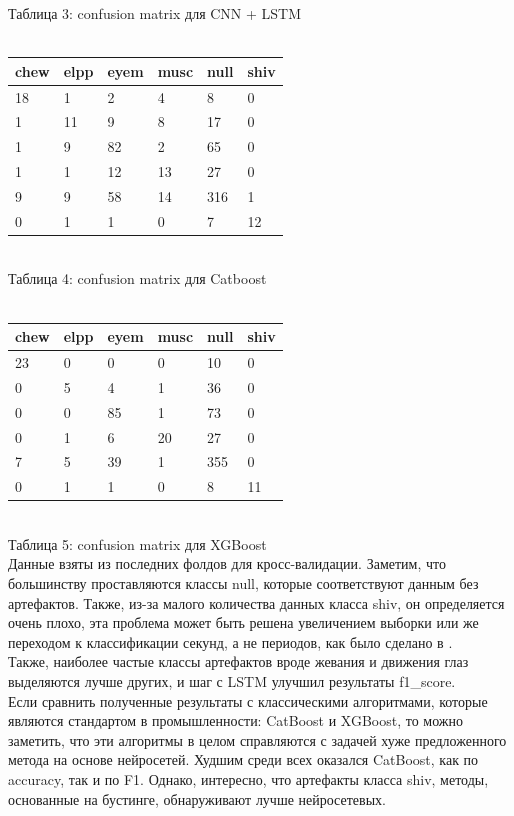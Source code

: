 \documentclass[12pt, a4paper, titlepage]{extreport}
\begin{document}
	Таблица 3: confusion matrix для CNN + LSTM \\
	\\
	\begin{tabular}{|l|l|l|l| l| l|}
		\hline
		chew & elpp & eyem & musc & null & shiv   \\ \hline
		 18 & 1 & 2 & 4 & 8 & 0  \\ \hline
		1 & 11 & 9 & 8 & 17 & 0  \\ \hline
		1 & 9 & 82 & 2 & 65 & 0  \\ \hline
		1 & 1 & 12 & 13 & 27 & 0  \\ \hline
		9 & 9 & 58 & 14 & 316 & 1  \\ \hline
		0 & 1 & 1 & 0 & 7 & 12  \\ \hline
	\end{tabular}\\
	Таблица 4: confusion matrix для Catboost \\
	\\
	\begin{tabular}{|l|l|l|l| l| l|}
		\hline
		chew & elpp & eyem & musc & null & shiv   \\ \hline
		23 & 0 & 0 & 0 & 10 & 0 \\ \hline
		0 & 5 & 4 & 1 & 36 & 0 \\ \hline
		0 & 0 & 85 & 1 & 73 & 0 \\ \hline
		0 & 1 & 6 & 20 & 27 & 0 \\ \hline
		7 & 5 & 39 & 1 & 355 & 0 \\ \hline
		0 & 1 & 1 & 0 & 8 & 11 \\ \hline
	\end{tabular}\\
	Таблица 5: confusion matrix для XGBoost \\
	Данные взяты из последних фолдов для кросс-валидации. Заметим, что большинству проставляются классы null, которые соответствуют данным без артефактов. Также, из-за малого количества данных класса shiv, он определяется очень плохо, эта проблема может быть решена увеличением выборки или же переходом к классификации секунд, а не периодов, как было сделано в \cite{35}. \\
	Также, наиболее частые классы артефактов вроде жевания и движения глаз выделяются лучше других, и шаг с LSTM улучшил результаты f1\_score.\\
	Если сравнить полученные результаты с классическими алгоритмами, которые являются стандартом в промышленности: CatBoost и XGBoost, то можно заметить, что эти алгоритмы в целом справляются с задачей хуже предложенного метода на основе нейросетей. Худшим среди всех оказался CatBoost, как по accuracy, так и по F1. Однако, интересно, что артефакты класса shiv, методы, основанные на бустинге, обнаруживают лучше нейросетевых.\\
\end{document}
